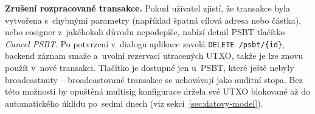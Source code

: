 \textbf{Zrušení rozpracované transakce.} Pokud uživatel zjistí, že
transakce byla vytvořena s~chybnými parametry (například špatná
cílová adresa nebo částka), nebo cosigner z~jakéhokoli důvodu
nepodepíše, nabízí detail PSBT tlačítko \emph{Cancel PSBT}. Po
potvrzení v~dialogu aplikace zavolá \texttt{DELETE /psbt/\{id\}},
backend záznam smaže a~uvolní rezervaci utracených UTXO, takže je lze
znovu použít v~nové transakci. Tlačítko je dostupné jen u~PSBT, které
ještě nebyly broadcastnuty -- broadcastované transakce se uchovávají
jako auditní stopa. Bez této možnosti by opuštěná multisig konfigurace
držela své UTXO blokované až do automatického úklidu po~sedmi dnech
(viz sekci~\ref{sec:datovy-model}).
